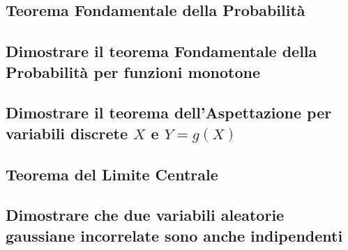 \documentclass[12pt,oneside,openany]{memoir}
\numberwithin{equation}{subsection}
\begin{document}

\subsection{Teorema Fondamentale della Probabilit\`a}


\subsection{Dimostrare il teorema Fondamentale della Probabilit\`a per funzioni
monotone}


\subsection{Dimostrare il teorema dell'Aspettazione per variabili discrete
$X$ e $Y = g(X)$}


\subsection{Teorema del Limite Centrale}


\subsection{Dimostrare che due variabili aleatorie gaussiane incorrelate sono
anche indipendenti}
\end{document}
